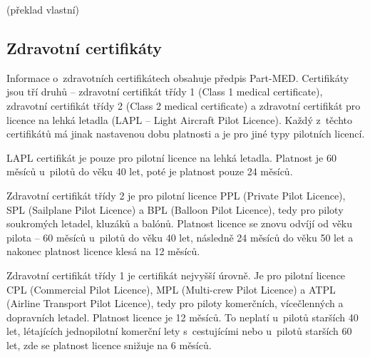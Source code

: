 \documentclass[thesis=M,czech]{FITthesis}[2012/06/26]
\begin{document}
 \cite{FTL} (překlad vlastní)

\subsection{Zdravotní certifikáty}
Informace o~zdravotních certifikátech obsahuje předpis Part-MED. Certifikáty jsou tří druhů -- zdravotní certifikát třídy 1 (Class 1 medical certificate), zdravotní certifikát třídy 2 (Class 2 medical certificate) a zdravotní certifikát pro licence na lehká letadla (LAPL -- Light Aircraft Pilot Licence). Každý z~těchto certifikátů má jinak nastavenou dobu platnosti a je pro jiné typy pilotních licencí.

LAPL certifikát je pouze pro pilotní licence na lehká letadla. Platnost je 60 měsíců u~pilotů do věku 40 let, poté je platnost pouze 24 měsíců.

Zdravotní certifikát třídy 2 je pro pilotní licence PPL (Private Pilot Licence), SPL (Sailplane Pilot Licence) a BPL (Balloon Pilot Licence), tedy pro piloty soukromých letadel, kluzáků a balónů. Platnost licence se znovu odvíjí od věku pilota -- 60 měsíců u~pilotů do věku 40 let, následně 24 měsíců do věku 50 let a nakonec platnost licence klesá na 12 měsíců.

Zdravotní certifikát třídy 1 je certifikát nejvyšší úrovně. Je pro pilotní licence CPL (Commercial Pilot Licence), MPL (Multi-crew Pilot Licence) a ATPL (Airline Transport Pilot Licence), tedy pro piloty komerčních, vícečlenných a dopravních letadel. Platnost licence je 12 měsíců. To neplatí u~pilotů starších 40 let, létajících jednopilotní komerční lety s~cestujícími nebo u~pilotů starších 60 let, zde se platnost licence snižuje na 6 měsíců. \cite{CAA}
\end{document}
